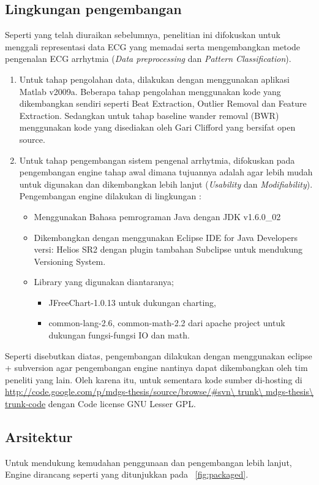 \subsection{Lingkungan pengembangan}
Seperti yang telah diuraikan sebelumnya, penelitian ini difokuskan untuk
menggali representasi data ECG yang memadai serta mengembangkan metode
pengenalan ECG arrhytmia (\emph{Data preprocessing} dan \emph{Pattern
Classification}). 
\begin{enumerate}
  \item Untuk tahap pengolahan data, dilakukan dengan menggunakan aplikasi
  Matlab v2009a. Beberapa tahap pengolahan menggunakan kode yang
  dikembangkan sendiri seperti Beat Extraction, Outlier Removal dan
  Feature Extraction. Sedangkan untuk tahap baseline wander removal (BWR)
  menggunakan kode yang disediakan oleh Gari Clifford \cite{clifford-2005} yang
  bersifat open source.
  \item Untuk tahap pengembangan sistem pengenal arrhytmia, difokuskan pada
  pengembangan engine tahap awal dimana tujuannya adalah agar lebih mudah untuk
  digunakan dan dikembangkan lebih lanjut (\emph{Usability} dan
  \emph{Modifiability}). Pengembangan engine dilakukan di lingkungan :
  \begin{itemize}
    \item Menggunakan Bahasa pemrograman Java dengan JDK v1.6.0\_02
    \item Dikembangkan dengan menggunakan Eclipse IDE for Java Developers
    versi: Helios SR2 dengan plugin tambahan Subclipse untuk mendukung
    Versioning System.
    \item Library yang digunakan diantaranya;
    \begin{itemize}
      \item JFreeChart-1.0.13 untuk dukungan charting, 
      \item common-lang-2.6, common-math-2.2 dari apache project untuk dukungan
      fungsi-fungsi IO dan math.
	\end{itemize}
  \end{itemize}
\end{enumerate}
Seperti disebutkan diatas, pengembangan dilakukan dengan menggunakan eclipse +
subversion agar pengembangan engine nantinya dapat dikembangkan oleh tim
peneliti yang lain. Oleh karena itu, untuk sementara kode sumber di-hosting di
\url{http://code.google.com/p/mdgs-thesis/source/browse/#svn\ trunk\
mdgs-thesis\ trunk-code} dengan Code license GNU Lesser GPL.

\subsection{Arsitektur}
Untuk mendukung kemudahan penggunaan dan pengembangan lebih lanjut, Engine
dirancang seperti yang ditunjukkan pada \pic~\ref{fig:packaged}.

